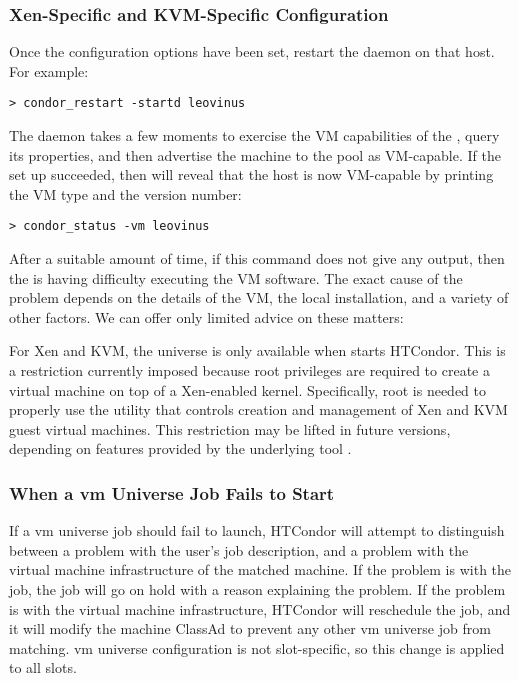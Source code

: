 \subsubsection{Xen-Specific and KVM-Specific Configuration}

Once the configuration options have been set, restart the  
daemon on that host.  For example:

\begin{verbatim}
> condor_restart -startd leovinus
\end{verbatim}

The  daemon takes a few moments to exercise the VM
capabilities of the , query its properties, and then 
advertise the machine to the pool as VM-capable.
If the set up succeeded,
 then  will reveal that the host is now 
VM-capable by printing the VM type and the version number:

\begin{verbatim}
> condor_status -vm leovinus
\end{verbatim}

After a suitable amount of time, if this command does not give any output,
then the  is having difficulty executing the VM software.
The exact cause of the problem depends on the details of the VM, the local 
installation, and a variety of other factors. We can offer only limited 
advice on these matters:

For Xen and KVM,
the  universe is only available when  starts HTCondor.
This is a restriction currently imposed because root privileges are 
required to create a virtual machine on top of a Xen-enabled kernel.
Specifically, root is needed 
to properly use the  utility that controls 
creation and management of Xen and KVM guest virtual machines.
This restriction may be lifted in future versions,
depending on features provided by the underlying tool .

\subsubsection{When a vm Universe Job Fails to Start}

If a vm universe job should fail to launch, 
HTCondor will attempt to distinguish
between a problem with the user's job description,
and a problem with the virtual machine infrastructure of the 
matched machine.  
If the problem is with the job, 
the job will go on hold with a reason explaining the problem.  
If the problem is with the virtual machine infrastructure,
HTCondor will reschedule the job, and it will modify the machine ClassAd
to prevent any other vm universe job from matching.
vm universe configuration is not slot-specific, 
so this change is applied to all slots.

